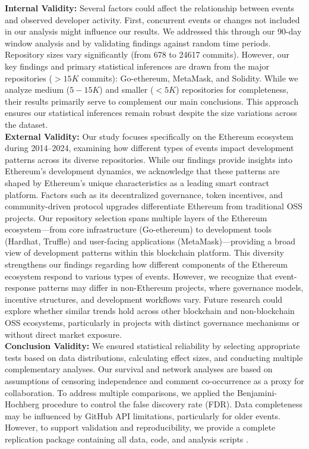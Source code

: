 \textbf{Internal Validity:} Several factors could affect the relationship between events and observed developer activity. First, concurrent events or changes not included in our analysis might influence our results. We addressed this through our 90-day window analysis and by validating findings against random time periods.
Repository sizes vary significantly (from 678 to 24617 commits). However, our key findings and primary statistical inferences are drawn from the major repositories ($>15K$ commits): Go-ethereum, MetaMask, and Solidity. While we analyze medium ($5-15K$) and smaller ($<5K$) repositories for completeness, their results primarily serve to complement our main conclusions. This approach ensures our statistical inferences remain robust despite the size variations across the dataset.\\
\textbf{External Validity:} Our study focuses specifically on the Ethereum ecosystem during 2014–2024, examining how different types of events impact development patterns across its diverse repositories. While our findings provide insights into Ethereum's development dynamics, we acknowledge that these patterns are shaped by Ethereum's unique characteristics as a leading smart contract platform. Factors such as its decentralized governance, token incentives, and community-driven protocol upgrades differentiate Ethereum from traditional OSS projects.
Our repository selection spans multiple layers of the Ethereum ecosystem—from core infrastructure (Go-ethereum) to development tools (Hardhat, Truffle) and user-facing applications (MetaMask)—providing a broad view of development patterns within this blockchain platform. This diversity strengthens our findings regarding how different components of the Ethereum ecosystem respond to various types of events. However, we recognize that event-response patterns may differ in non-Ethereum projects, where governance models, incentive structures, and development workflows vary. 
Future research could explore whether similar trends hold across other blockchain and non-blockchain OSS ecosystems, particularly in projects with distinct governance mechanisms or without direct market exposure.\\ 
\textbf{Conclusion Validity:} We ensured statistical reliability by selecting appropriate tests based on data distributions, calculating effect sizes, and conducting multiple complementary analyses. Our survival and network analyses are based on assumptions of censoring independence and comment co-occurrence as a proxy for collaboration. To address multiple comparisons, we applied the Benjamini-Hochberg procedure to control the false discovery rate (FDR).  
Data completeness may be influenced by GitHub API limitations, particularly for older events. However, to support validation and reproducibility, we provide a complete replication package containing all data, code, and analysis scripts \cite{Vaccargiu2025}.


